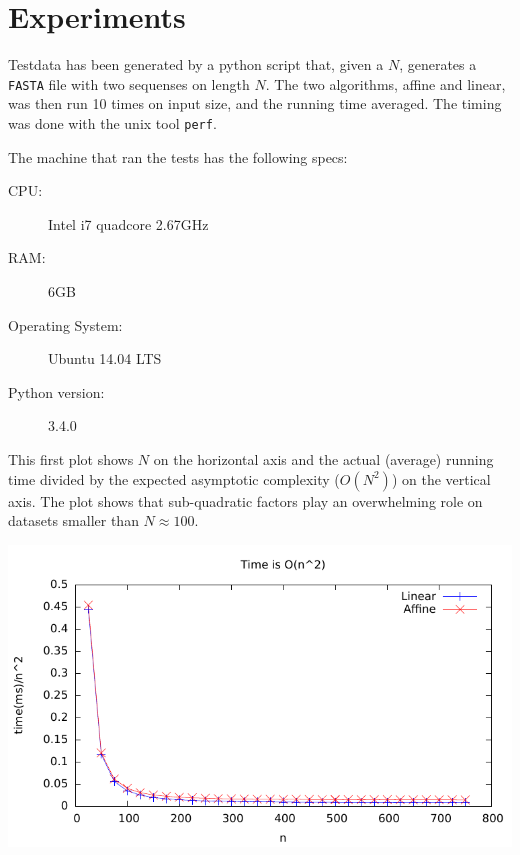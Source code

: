 \section{Experiments}

Testdata has been generated by a python script that, given a $N$,
generates a \verb|FASTA| file with two sequenses on length $N$. The
two algorithms, affine and linear, was then run 10 times on input
size, and the running time averaged. The timing was done with the unix
tool \verb|perf|.

The machine that ran the tests has the following specs:
\begin{description}
\item[CPU:] Intel i7 quadcore 2.67GHz
\item[RAM:] 6GB
\item[Operating System:] Ubuntu 14.04 LTS
\item[Python version:] 3.4.0
\end{description}

This first plot shows $N$ on the horizontal axis and the actual
(average) running time divided by the expected asymptotic complexity
($O(N^2)$) on the vertical axis. The plot shows that sub-quadratic
factors play an overwhelming role on datasets smaller than $N \approx
100$.
\begin{center}
	\includegraphics[width=\textwidth]{../plots/plot1.pdf}
\end{center}

